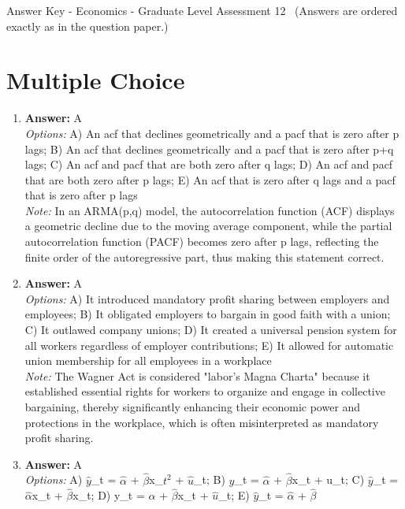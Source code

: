 \documentclass[12pt]{article}
\begin{document}
\begin{center}
Answer Key - Economics - Graduate Level Assessment 12 \
\small (Answers are ordered exactly as in the question paper.)
\end{center}

\section*{Multiple Choice}
\begin{enumerate}[label=\arabic*.]
\item \textbf{Answer:} A
\\ \textit{Options:} A) An acf that declines geometrically and a pacf that is zero after p lags; B) An acf that declines geometrically and a pacf that is zero after p+q lags; C) An acf and pacf that are both zero after q lags; D) An acf and pacf that are both zero after p lags; E) An acf that is zero after q lags and a pacf that is zero after p lags
\\ \textit{Note:} In an ARMA(p,q) model, the autocorrelation function (ACF) displays a geometric decline due to the moving average component, while the partial autocorrelation function (PACF) becomes zero after p lags, reflecting the finite order of the autoregressive part, thus making this statement correct.
\item \textbf{Answer:} A
\\ \textit{Options:} A) It introduced mandatory profit sharing between employers and employees; B) It obligated employers to bargain in good faith with a union; C) It outlawed company unions; D) It created a universal pension system for all workers regardless of employer contributions; E) It allowed for automatic union membership for all employees in a workplace
\\ \textit{Note:} The Wagner Act is considered "labor's Magna Charta" because it established essential rights for workers to organize and engage in collective bargaining, thereby significantly enhancing their economic power and protections in the workplace, which is often misinterpreted as mandatory profit sharing.
\item \textbf{Answer:} A
\\ \textit{Options:} A) \ensuremath{\hat{y}}\_t = \ensuremath{\hat{\alpha}} + \ensuremath{\hat{\beta}}x\_$t^2$ + \ensuremath{\hat{u}}\_t; B) \ensuremath{\hat{y}}\_t = \ensuremath{\hat{\alpha}} + \ensuremath{\hat{\beta}}x\_t + u\_t; C) \ensuremath{\hat{y}}\_t = \ensuremath{\hat{\alpha}}x\_t + \ensuremath{\hat{\beta}}x\_t; D) y\_t = \ensuremath{\hat{\alpha}} + \ensuremath{\hat{\beta}}x\_t + \ensuremath{\hat{u}}\_t; E) \ensuremath{\hat{y}}\_t = \ensuremath{\hat{\alpha}} + \ensuremath{\hat{\beta}}

\end{enumerate}
\end{document}
